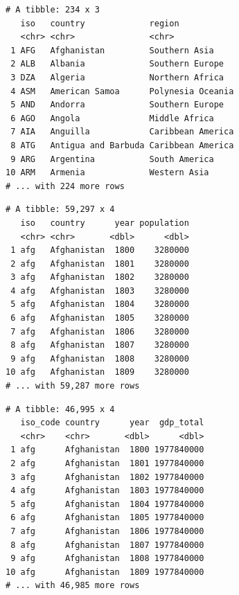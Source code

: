 \documentclass[
  11pt,
]{krantz}
\newenvironment{Shaded}{\begin{snugshade}}{\end{snugshade}}
\newcommand{\NormalTok}[1]{#1}
\newcommand{\OperatorTok}[1]{\textcolor[rgb]{0.43,0.43,0.43}{\textbf{#1}}}
\newcommand{\StringTok}[1]{\textcolor[rgb]{0.5,0.5,0.5}{#1}}
\begin{document}
\begin{Shaded}
\end{Shaded}

\begin{verbatim}
# A tibble: 234 x 3
   iso   country             region           
   <chr> <chr>               <chr>            
 1 AFG   Afghanistan         Southern Asia    
 2 ALB   Albania             Southern Europe  
 3 DZA   Algeria             Northern Africa  
 4 ASM   American Samoa      Polynesia Oceania
 5 AND   Andorra             Southern Europe  
 6 AGO   Angola              Middle Africa    
 7 AIA   Anguilla            Caribbean America
 8 ATG   Antigua and Barbuda Caribbean America
 9 ARG   Argentina           South America    
10 ARM   Armenia             Western Asia     
# ... with 224 more rows
\end{verbatim}

\begin{Shaded}
\end{Shaded}

\begin{verbatim}
# A tibble: 59,297 x 4
   iso   country      year population
   <chr> <chr>       <dbl>      <dbl>
 1 afg   Afghanistan  1800    3280000
 2 afg   Afghanistan  1801    3280000
 3 afg   Afghanistan  1802    3280000
 4 afg   Afghanistan  1803    3280000
 5 afg   Afghanistan  1804    3280000
 6 afg   Afghanistan  1805    3280000
 7 afg   Afghanistan  1806    3280000
 8 afg   Afghanistan  1807    3280000
 9 afg   Afghanistan  1808    3280000
10 afg   Afghanistan  1809    3280000
# ... with 59,287 more rows
\end{verbatim}

\begin{Shaded}
\end{Shaded}

\begin{verbatim}
# A tibble: 46,995 x 4
   iso_code country      year  gdp_total
   <chr>    <chr>       <dbl>      <dbl>
 1 afg      Afghanistan  1800 1977840000
 2 afg      Afghanistan  1801 1977840000
 3 afg      Afghanistan  1802 1977840000
 4 afg      Afghanistan  1803 1977840000
 5 afg      Afghanistan  1804 1977840000
 6 afg      Afghanistan  1805 1977840000
 7 afg      Afghanistan  1806 1977840000
 8 afg      Afghanistan  1807 1977840000
 9 afg      Afghanistan  1808 1977840000
10 afg      Afghanistan  1809 1977840000
# ... with 46,985 more rows
\end{verbatim}
\end{document}
